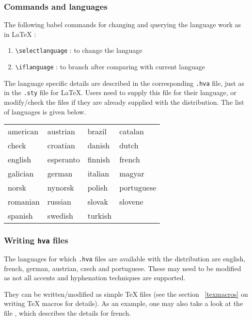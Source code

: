 \subsubsection{Commands and languages}
The following babel commands for changing and querying the language work as in \LaTeX{} :
\begin{enumerate}
\item {\verb+\selectlanguage+ : to change the language}
\item {\verb+\iflanguage+ : to branch after comparing with current language}
\end{enumerate}  

The language specific details are described in the corresponding
\verb+.hva+ file, just as in the \verb+.sty+ file for \LaTeX. Users
need to supply this file for their language, or modify/check the files
if they are already supplied with the distribution. The list of
languages is given below.

\begin{center}
\begin{tabular}{|l|l|l|l|}
\hline
american & austrian & brazil & catalan \\
check & croatian & danish & dutch \\
english & esperanto & finnish & french \\
galician & german & italian & magyar \\
norsk & nynorsk & polish & portuguese \\
romanian & russian & slovak & slovene \\
spanish & swedish & turkish & \\
\hline
\end{tabular}
\end{center}

\subsubsection{Writing \texttt{hva} files}

The languages for which {\tt .hva} files are available with the
distribution are english, french, german, austrian, czech and portuguese. These
may need to be modified as not all accents and hyphenation techniques
are supported.

They can be written/modified as simple \TeX{} files (see the section ~\ref{texmacros} on writing \TeX{} macros for details). As an example, one may also take a look at the file , which describes the details for french. 


